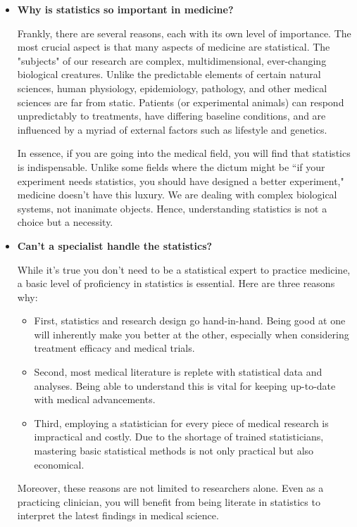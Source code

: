 \begin{itemize}

\item {\bf Why is statistics so important in medicine?}

Frankly, there are several reasons, each with its own level of importance. The most crucial aspect is that many aspects of medicine are statistical. The "subjects" of our research are complex, multidimensional, ever-changing biological creatures. Unlike the predictable elements of certain natural sciences, human physiology, epidemiology, pathology, and other medical sciences are far from static. Patients (or experimental animals) can respond unpredictably to treatments, have differing baseline conditions, and are influenced by a myriad of external factors such as lifestyle and genetics.

In essence, if you are going into the medical field, you will find that statistics is indispensable. Unlike some fields where the dictum might be ``if your experiment needs statistics, you should have designed a better experiment," medicine doesn't have this luxury. We are dealing with complex biological systems, not inanimate objects. Hence, understanding statistics is not a choice but a necessity.

\item {\bf Can't a specialist handle the statistics?}

While it's true you don't need to be a statistical expert to practice medicine, a basic level of proficiency in statistics is essential. Here are three reasons why:

\begin{itemize}
\item First, statistics and research design go hand-in-hand. Being good at one will inherently make you better at the other, especially when considering treatment efficacy and medical trials.
\item Second, most medical literature is replete with statistical data and analyses. Being able to understand this is vital for keeping up-to-date with medical advancements.
\item Third, employing a statistician for every piece of medical research is impractical and costly. Due to the shortage of trained statisticians, mastering basic statistical methods is not only practical but also economical.
\end{itemize}

\noindent
Moreover, these reasons are not limited to researchers alone. Even as a practicing clinician, you will benefit from being literate in statistics to interpret the latest findings in medical science.


\end{itemize}

